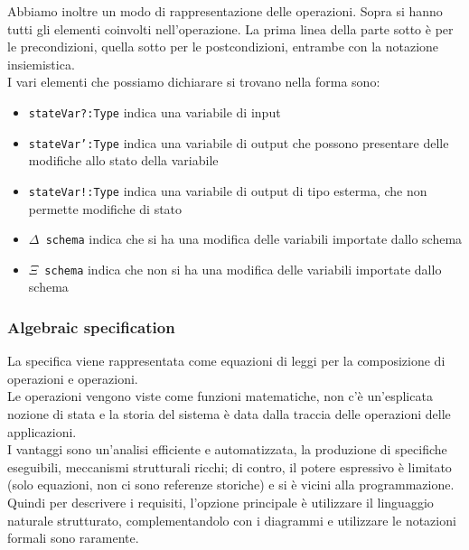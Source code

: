 Abbiamo inoltre un modo di rappresentazione delle operazioni. Sopra si hanno tutti gli elementi coinvolti nell'operazione. La prima linea della parte sotto è per le precondizioni, quella sotto per le postcondizioni, entrambe con la notazione insiemistica.\\
I vari elementi che possiamo dichiarare si trovano nella forma sono: 
\begin{itemize}
  \item \texttt{stateVar?:Type} indica una variabile di input
  \item \texttt{stateVar':Type} indica una variabile di output che possono presentare delle modifiche allo stato della variabile
  \item \texttt{stateVar!:Type} indica una variabile di output di tipo esterma, che non permette modifiche di stato
  \item \texttt{$\Delta$ schema} indica che si ha una modifica delle variabili importate dallo schema
  \item \texttt{$\Xi$ schema} indica che non si ha una modifica delle variabili importate dallo schema
\end{itemize}

\subsubsection{Algebraic specification}
La specifica viene rappresentata come equazioni di leggi per la composizione di operazioni e operazioni.\\
Le operazioni vengono viste come funzioni matematiche, non c’è un’esplicata nozione di stata e la storia del sistema è data dalla traccia delle operazioni delle applicazioni.\\
I vantaggi sono un’analisi efficiente e automatizzata, la produzione di specifiche eseguibili, meccanismi strutturali ricchi; di contro, il potere espressivo è limitato (solo equazioni, non ci sono referenze storiche) e si è vicini alla programmazione.\\
   
Quindi per descrivere i requisiti, l’opzione principale è utilizzare il linguaggio naturale strutturato, complementandolo con i diagrammi e utilizzare le notazioni formali sono raramente.